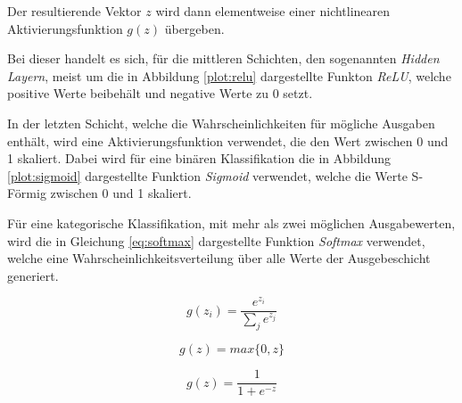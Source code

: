 Der resultierende Vektor $z$ wird dann elementweise
einer nichtlinearen Aktivierungsfunktion $g(z)$ übergeben.

Bei dieser handelt es sich, für die mittleren Schichten, 
den sogenannten \textit{Hidden Layern},  
meist um die in Abbildung \ref{plot:relu} dargestellte
Funkton \textit{ReLU}, welche positive Werte beibehält und negative 
Werte zu 0 setzt.

In der letzten Schicht, welche die Wahrscheinlichkeiten 
für mögliche Ausgaben enthält, wird eine Aktivierungsfunktion
verwendet, die den Wert zwischen 0 und 1 skaliert.
Dabei wird für eine binären Klassifikation die 
in Abbildung \ref{plot:sigmoid} dargestellte Funktion 
\textit{Sigmoid} verwendet, welche die Werte S-Förmig zwischen 
0 und 1 skaliert.

Für eine kategorische Klassifikation, 
mit mehr als zwei möglichen Ausgabewerten, 
wird die in Gleichung 
\ref{eq:softmax} dargestellte Funktion \textit{Softmax} 
verwendet, welche eine
Wahrscheinlichkeitsverteilung über alle Werte
der Ausgebeschicht generiert.

\begin{equation}
    \label{eq:softmax}
    g(z_{i}) = \frac{e^{z_{i}}}{\sum_{j} e^{z_{j}}}
\end{equation}
\newpage
\begin{minipage}{0.5\textwidth}
    \centering
    \begin{equation*}
        \label{eq:relu}
        g(z) = max\{0,z\}
    \end{equation*}
\end{minipage}
\vspace{1cm}
\begin{minipage}{0.5\textwidth}
    \centering
    \begin{equation*}
        \label{eq:sidmoid}
        g(z) = \frac{1}{1 + e^{-z}}
    \end{equation*}    
\end{minipage}
\begin{minipage}{0.5\textwidth}
    \centering
    
    \label{plot:relu}
\end{minipage}
\begin{minipage}{0.5\textwidth}
    \centering
    
    \label{plot:sigmoid}
\end{minipage}
\vspace{1cm}


